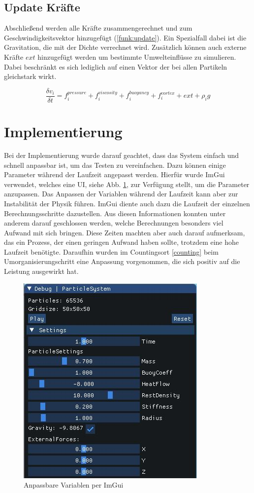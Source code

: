 \documentclass[intern,palatino]{cgBA}
\begin{document}

\subsection{Update Kräfte}\label{kräfte}

Abschließend werden alle Kräfte zusammengerechnet und zum Geschwindigkeitsvektor hinzugefügt (\ref{funk:update}). Ein Spezialfall dabei ist die Gravitation, die mit der Dichte verrechnet wird. Zusätzlich können auch externe Kräfte $ext$ hinzugefügt werden um bestimmte Umwelteinflüsse zu simulieren. Dabei beschränkt es sich lediglich auf einen Vektor der bei allen Partikeln gleichstark wirkt.
\newline

\begin{equation}\label{funk:update}
\frac{\delta v_i}{\delta t}  = f^{pressure}_i + f^{viscosity}_i + f^{buoyancy}_i + f^{vortex}_i + ext + \rho_i g
\end{equation}


\section{Implementierung}\label{imp}

Bei der Implementierung wurde darauf geachtet, dass das System einfach und schnell anpassbar ist, um das Testen zu vereinfachen.
Dazu können einige Parameter während der Laufzeit angepasst werden. Hierfür wurde ImGui \cite{ocornut} verwendet, welches eine UI, siehe Abb. \ref{img:ext}, zur Verfügung stellt, um die Parameter anzupassen.
Das Anpassen der Variablen während der Laufzeit kann aber zur Instabilität der Physik führen.
\newline
ImGui diente auch dazu die Laufzeit der einzelnen Berechnungsschritte dazustellen. Aus diesen Informationen konnten unter anderem darauf geschlossen werden, welche Berechnungen besonders viel Aufwand mit sich bringen. Diese Zeiten machten aber auch darauf aufmerksam, das ein Prozess, der einen geringen Aufwand haben sollte, trotzdem eine hohe Laufzeit benötigte. Daraufhin wurden im Countingsort \ref{counting} beim Umorganisierungschritt eine Anpassung vorgenommen, die sich positiv auf die Leistung ausgewirkt hat.

\begin{figure}[H]
	\centering
	\includegraphics[width=0.35\columnwidth]{Bilder/external.jpg}
	\caption{Anpassbare Variablen per ImGui}
	\label{img:ext}
\end{figure}
\end{document}

